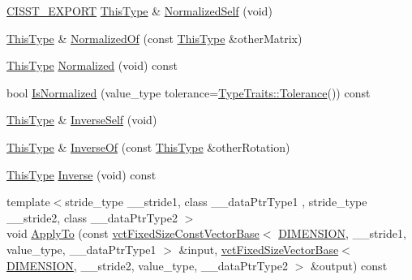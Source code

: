 \begin{DoxyCompactItemize}
\item 
\hyperlink{cmn_export_macros_8h_a99393e0c3ac434b2605235bbe20684f8}{C\-I\-S\-S\-T\-\_\-\-E\-X\-P\-O\-R\-T} \hyperlink{classvct_matrix_rotation2_base_a47ffeef2ddecede4b16bcc88fb432ff5}{This\-Type} \& \hyperlink{classvct_matrix_rotation2_base_a84931c143416b6de688367d23ec91243}{Normalized\-Self} (void)
\item 
\hyperlink{classvct_matrix_rotation2_base_a47ffeef2ddecede4b16bcc88fb432ff5}{This\-Type} \& \hyperlink{classvct_matrix_rotation2_base_a7e348f39bc55162ee27cd8a0d9bf7dc9}{Normalized\-Of} (const \hyperlink{classvct_matrix_rotation2_base_a47ffeef2ddecede4b16bcc88fb432ff5}{This\-Type} \&other\-Matrix)
\item 
\hyperlink{classvct_matrix_rotation2_base_a47ffeef2ddecede4b16bcc88fb432ff5}{This\-Type} \hyperlink{classvct_matrix_rotation2_base_a09dd07b7051b4eb64f9437d82fa666e8}{Normalized} (void) const 
\item 
bool \hyperlink{classvct_matrix_rotation2_base_a197a707b82066472958ee3bc0b4a5998}{Is\-Normalized} (value\-\_\-type tolerance=\hyperlink{classcmn_type_traits_adc129bf9867295b90d300768b780fa99}{Type\-Traits\-::\-Tolerance}()) const 
\item 
\hyperlink{classvct_matrix_rotation2_base_a47ffeef2ddecede4b16bcc88fb432ff5}{This\-Type} \& \hyperlink{classvct_matrix_rotation2_base_a5c173d1356372dbb7de020f5873b17af}{Inverse\-Self} (void)
\item 
\hyperlink{classvct_matrix_rotation2_base_a47ffeef2ddecede4b16bcc88fb432ff5}{This\-Type} \& \hyperlink{classvct_matrix_rotation2_base_a418f25800e076f95a5c5c1ace4958384}{Inverse\-Of} (const \hyperlink{classvct_matrix_rotation2_base_a47ffeef2ddecede4b16bcc88fb432ff5}{This\-Type} \&other\-Rotation)
\item 
\hyperlink{classvct_matrix_rotation2_base_a47ffeef2ddecede4b16bcc88fb432ff5}{This\-Type} \hyperlink{classvct_matrix_rotation2_base_a0e2f782adb2e752ff1a7ae135071824a}{Inverse} (void) const 
\item 
{\footnotesize template$<$stride\-\_\-type \-\_\-\-\_\-stride1, class \-\_\-\-\_\-data\-Ptr\-Type1 , stride\-\_\-type \-\_\-\-\_\-stride2, class \-\_\-\-\_\-data\-Ptr\-Type2 $>$ }\\void \hyperlink{classvct_matrix_rotation2_base_a0be911d69544f855030007185ec2b227}{Apply\-To} (const \hyperlink{classvct_fixed_size_const_vector_base}{vct\-Fixed\-Size\-Const\-Vector\-Base}$<$ \hyperlink{classvct_matrix_rotation2_base_ac10279ed12ec787b1a4833ea02771348acefb9855f54f0cfd782e785c9083e592}{D\-I\-M\-E\-N\-S\-I\-O\-N}, \-\_\-\-\_\-stride1, value\-\_\-type, \-\_\-\-\_\-data\-Ptr\-Type1 $>$ \&input, \hyperlink{classvct_fixed_size_vector_base}{vct\-Fixed\-Size\-Vector\-Base}$<$ \hyperlink{classvct_matrix_rotation2_base_ac10279ed12ec787b1a4833ea02771348acefb9855f54f0cfd782e785c9083e592}{D\-I\-M\-E\-N\-S\-I\-O\-N}, \-\_\-\-\_\-stride2, value\-\_\-type, \-\_\-\-\_\-data\-Ptr\-Type2 $>$ \&output) const 

\end{DoxyCompactItemize}
